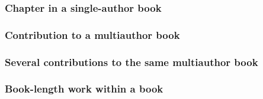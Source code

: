 \documentclass[11pt,letterpaper,oneside]{article}
\begin{document}
\subsubsection{Chapter in a single-author book}

\begin{citebib}
\item \cite[211]{brower2015.8}
\item \cite{samples2006.7}
\item \cite[30-31]{samples2006.7}
\end{citebib}

\subsubsection{Contribution to a multiauthor book}

\begin{citebib}
\item \cite[325]{miller2014}
\item \cite{ellet1968}
\end{citebib}

\subsubsection{Several contributions to the same multiauthor book}
\label{14.108}



\begin{citebib}
\item \cite[84--87]{keating1968}
\item \cite[362--70]{lippincott1968}
\item \cite[107--19]{draper1987}
\item \cite[189--207]{harrington1987}
\nocite{angle1968,zukowsky1987}
\end{citebib}

\subsubsection{Book-length work within a book}
\label{14.109}
\end{document}
